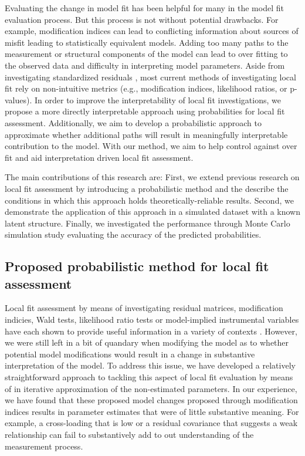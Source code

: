 \documentclass[noextraspace, floatsintext, 12pt]{apa7}
\begin{document}
Evaluating the change in model fit has been helpful for many in the model fit evaluation process. 
But this process is not without potential drawbacks.
For example, modification indices can lead to conflicting information about sources of misfit leading to statistically equivalent models.
Adding too many paths to the measurement or structural components of the model can lead to over fitting to the observed data and difficulty in interpreting model parameters.
Aside from investigating standardized residuals \citep{Maydeu2017}, most current methods of investigating local fit rely on non-intuitive metrics (e.g., modification indices, likelihood ratios, or p-values). In order to improve the interpretability of local fit investigations, we propose a more directly interpretable approach using probabilities for local fit assessment. 
Additionally, we aim to develop a probabilistic approach to approximate whether additional paths will result in meaningfully interpretable contribution to the model.
With our method, we aim to help control against over fit and aid interpretation driven local fit assessment.

The main contributions of this research are: First, we extend previous research on local fit assessment by introducing a probabilistic method and the describe the conditions in which this approach holds theoretically-reliable results. 
Second, we demonstrate the application of this approach in a simulated dataset with a known latent structure.
Finally, we investigated the performance through Monte Carlo simulation study evaluating the accuracy of the predicted probabilities.

\subsection{Proposed probabilistic method for local fit assessment}

Local fit assessment by means of investigating residual matrices, modification indicies, Wald tests, likelihood ratio tests or model-implied instrumental variables have each shown to provide useful information in a variety of contexts \citep{Chou1990, Whittaker2012, Maydeu2017}.
However, we were still left in a bit of quandary when modifying the model as to whether potential model modifications would result in a change in substantive interpretation of the model.  
To address this issue, we have developed a relatively straightforward approach to tackling this aspect of local fit evaluation by means of in iterative approximation of the non-estimated parameters.
In our experience, we have found that these proposed model changes proposed through modification indices results in parameter estimates that were of little substantive meaning.
For example, a cross-loading that is low or a residual covariance that suggests a weak relationship can fail to substantively add to out understanding of the measurement process.
\end{document}

